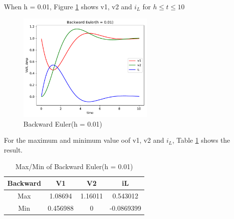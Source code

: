 \documentclass{article}
\begin{document}
When h = 0.01, Figure \ref{fig:back 001} shows v1, v2 and $i_L$ for $h \leq t \leq 10$
\begin{figure}[H]
    \centering
    \includegraphics[width=0.6\textwidth]{src/back_001.pdf}
    \caption{Backward Euler(h = 0.01)}
    \label{fig:back 001}
\end{figure}
For the maximum and minimum value oof v1, v2 and $i_L$, Table \ref{tab:back 001} shows the result.
\begin{table}[H]
    \begin{center}
        \begin{tabular}{|c|c|c|c|}
            \hline
            Backward & V1 & V2 & iL \\ \hline
            Max & 1.08694 & 1.16011 & 0.543012 \\ \hline
            Min & 0.456988 & 0 & -0.0869399 \\ \hline
        \end{tabular}
    \end{center}
    \caption{Max/Min of Backward Euler(h = 0.01)}
    \label{tab:back 001}
\end{table}
\end{document}
